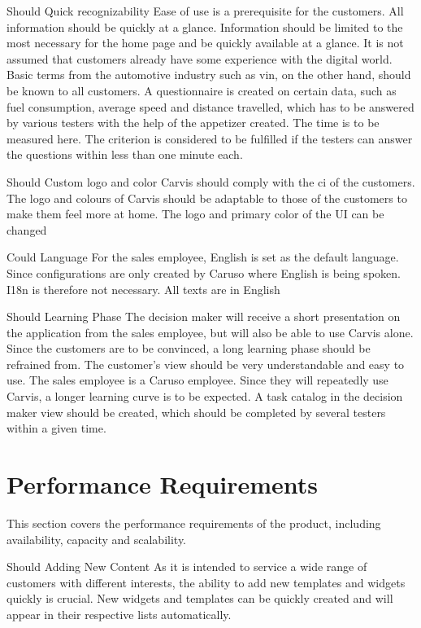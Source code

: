 {Should}
{Quick recognizability}
{Ease of use is a prerequisite for the customers. All information should be quickly at a glance. Information should be limited to the most necessary for the home page and be quickly available at a glance. It is not assumed that customers already have some experience with the digital world. Basic terms from the automotive industry such as \gls{vin}, on the other hand, should be known to all customers.}
{A questionnaire is created on certain data, such as fuel consumption, average speed and distance travelled, which has to be answered by various testers with the help of the appetizer created. The time is to be measured here. The criterion is considered to be fulfilled if the testers can answer the questions within less than one minute each.}

{Should}
{Custom logo and color}
{Carvis should comply with the \gls{ci} of the customers. The logo and colours of Carvis should be adaptable to those of the customers to make them feel more at home.}
{The logo and primary color of the UI can be changed}

{Could}
{Language}
{For the sales employee, English is set as the default language. Since configurations are only created by Caruso where English is being spoken. I18n is therefore not necessary.}
{All texts are in English}

{Should}
{Learning Phase}
{The decision maker will receive a short presentation on the application from the sales employee, but will also be able to use Carvis alone. Since the customers are to be convinced, a long learning phase should be refrained from. The customer's view should be very understandable and easy to use. The sales employee is a Caruso employee. Since they will repeatedly use Carvis, a longer learning curve is to be expected. }
{A task catalog in the decision maker view should be created, which should be completed by several testers within a given time.}


\section{Performance Requirements}
This section covers the performance requirements of the product, including availability, capacity and scalability.

{Should}
{Adding New Content}
{As it is intended to service a wide range of customers with different interests, the ability to add new templates and widgets quickly is crucial.}
{New widgets and templates can be quickly created and will appear in their respective lists automatically.}

